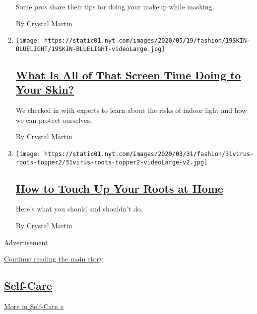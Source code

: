 \begin{enumerate}
  Some pros share their tips for doing your makeup while masking.

  By Crystal Martin
\item
  \texttt{[image: https://static01.nyt.com/images/2020/05/19/fashion/19SKIN-BLUELIGHT/19SKIN-BLUELIGHT-videoLarge.jpg]}

  \hypertarget{what-is-all-of-that-screen-time-doing-to-your-skin}{%
  \subsection{\texorpdfstring{\href{/2020/05/20/style/skin-damage-blue-light-what-is-all-of-that-screen-time-doing-to-your-skin.html}{What
  Is All of That Screen Time Doing to Your
  Skin?}}{What Is All of That Screen Time Doing to Your Skin?}}\label{what-is-all-of-that-screen-time-doing-to-your-skin}}

  We checked in with experts to learn about the risks of indoor light
  and how we can protect ourselves.

  By Crystal Martin
\item
  \texttt{[image: https://static01.nyt.com/images/2020/03/31/fashion/31virus-roots-topper2/31virus-roots-topper2-videoLarge-v2.jpg]}

  \hypertarget{how-to-touch-up-your-roots-at-home}{%
  \subsection{\texorpdfstring{\href{/2020/03/31/style/how-to-touch-up-your-roots-at-home.html}{How
  to Touch Up Your Roots at
  Home}}{How to Touch Up Your Roots at Home}}\label{how-to-touch-up-your-roots-at-home}}

  Here's what you should and shouldn't do.

  By Crystal Martin
\end{enumerate}

Advertisement

\protect\hyperlink{after-mid3}{Continue reading the main story}

\hypertarget{self-care}{%
\subsection{\texorpdfstring{\href{/section/style/self-care}{Self-Care}}{Self-Care}}\label{self-care}}

\href{/section/style/self-care}{More in Self-Care »}

